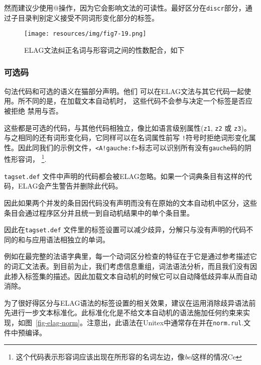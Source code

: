 \bigskip
\noindent
然而建议少使用@操作，因为它会影响文法的可读性。最好区分在\verb$discr$部分，通过子目录判别定义接受不同词形变化部分的标签。

\begin{figure}[!h]
\begin{center}
\texttt{[image: resources/img/fig7-19.png]}
\caption{
ELAG文法纠正名词与形容词之间的性数配合，如下
\label{fig-NA}}
\end{center}
\end{figure}

\subsubsection{可选码}
句法代码和可选的语义在猫部分声明。他们
可以在ELAG文法与其它代码一起使用。所不同的是，在加载文本自动机时，
这些代码不会参与决定一个标签是否应被拒绝
禁用与否。


\bigskip
\noindent 
这些都是可选的代码，与其他代码相独立，像比如语言级别属性(\verb$z1$, \verb$z2$ 或 \verb$z3$)。
与之相同的还有词形变化码，它同样可以在名词属性前写 \verb$!$符号时拒绝词形变化属性。因此同我们的示例文件，\verb$<A!gauche:f>$标志可以识别所有没有\verb$gauche$码的阴性形容词，
\footnote{
这个代码表示形容词应该出现在所形容的名词左边，像\textit{bel}这样的情况Ce }.

\bigskip
{}\verb$tagset.def$ 文件中声明的代码都会被ELAG忽略。如果一个词典条目有这样的代码，ELAG会产生警告并删除此代码。 



\bigskip
\noindent 
因此如果两个并发的条目因代码没有声明而没有在原始的文本自动机中区分，这些条目会通过程序区分并且统一到自动机结果中的单个条目里。

\bigskip
\noindent 因此在\verb$tagset.def$  文件里的标签设置可以减少歧异，分解只与没有声明的代码不同的和与应用语法相独立的单词。                                                                            

\bigskip
\noindent
例如在最完整的法语字典里，每一个动词区分检查的特征在于它是通过参考描述它的词汇文法表。到目前为止，我们考虑信息重组，词法语法分析，而且我们没有因此掺入标签集的描述。因此加载文本自动机的时候它可以自动降低歧异率从而自动消除。


\bigskip
\noindent
为了很好得区分与ELAG语法的标签设置的相关效果，建议在运用消除歧异语法前先进行一步文本标准化。此标准化化是不给文本自动机的语法施加任何约束来实现，如图~\ref{fig-elag-norm}。注意出，此语法在Unitex中通常存在并在\verb+norm.rul+.文件中预编译。

